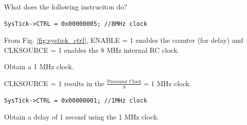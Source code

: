 \documentclass[journal,12pt,twocolumn]{IEEEtran}
\begin{document}
\begin{problem}
What does the following instruciton do?
\begin{lstlisting}
SysTick->CTRL = 0x00000005;	//8MHz clock
\end{lstlisting}
\end{problem}
\solution From Fig. \ref{fig:systick_ctrl}, ENABLE = 1 enables the counter (for delay) and CLKSOURCE = 1 enables the 8 MHz internal RC clock.
\begin{problem}
Obtain a 1 MHz clock. 
\end{problem}
\solution CLKSOURCE = 1 results in the $\frac{\text{Processor Clock}}{8} = 1$ MHz clock.
\begin{lstlisting}
SysTick->CTRL = 0x00000001;	//1MHz clock
\end{lstlisting}
\begin{problem}
Obtain a delay of 1 second using the 1 MHz clock.
\end{problem}
\end{document}
